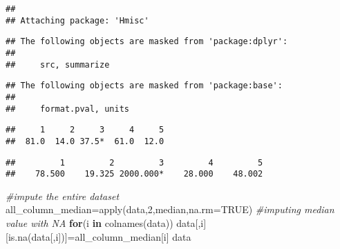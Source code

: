 \documentclass[
]{article}
\newenvironment{Shaded}{\begin{snugshade}}{\end{snugshade}}
\newcommand{\AttributeTok}[1]{\textcolor[rgb]{0.77,0.63,0.00}{#1}}
\newcommand{\CommentTok}[1]{\textcolor[rgb]{0.56,0.35,0.01}{\textit{#1}}}
\newcommand{\ConstantTok}[1]{\textcolor[rgb]{0.00,0.00,0.00}{#1}}
\newcommand{\ControlFlowTok}[1]{\textcolor[rgb]{0.13,0.29,0.53}{\textbf{#1}}}
\newcommand{\DecValTok}[1]{\textcolor[rgb]{0.00,0.00,0.81}{#1}}
\newcommand{\FunctionTok}[1]{\textcolor[rgb]{0.00,0.00,0.00}{#1}}
\newcommand{\NormalTok}[1]{#1}
\newcommand{\OtherTok}[1]{\textcolor[rgb]{0.56,0.35,0.01}{#1}}
\newcommand{\SpecialCharTok}[1]{\textcolor[rgb]{0.00,0.00,0.00}{#1}}
\begin{document}
\begin{verbatim}
## 
## Attaching package: 'Hmisc'
\end{verbatim}

\begin{verbatim}
## The following objects are masked from 'package:dplyr':
## 
##     src, summarize
\end{verbatim}

\begin{verbatim}
## The following objects are masked from 'package:base':
## 
##     format.pval, units
\end{verbatim}

\begin{Shaded}
\end{Shaded}

\begin{verbatim}
##     1     2     3     4     5 
##  81.0  14.0 37.5*  61.0  12.0
\end{verbatim}

\begin{Shaded}
\end{Shaded}

\begin{verbatim}
##         1         2         3         4         5 
##    78.500    19.325 2000.000*    28.000    48.002
\end{verbatim}

\begin{Shaded}
\begin{Highlighting}[]
\CommentTok{\#impute the entire dataset}
\NormalTok{all\_column\_median}\OtherTok{=}\FunctionTok{apply}\NormalTok{(data,}\DecValTok{2}\NormalTok{,median,}\AttributeTok{na.rm=}\ConstantTok{TRUE}\NormalTok{)}
\CommentTok{\#imputing median value with NA}
\ControlFlowTok{for}\NormalTok{(i }\ControlFlowTok{in} \FunctionTok{colnames}\NormalTok{(data))}
\NormalTok{  data[,i][}\FunctionTok{is.na}\NormalTok{(data[,i])]}\OtherTok{=}\NormalTok{all\_column\_median[i]}
\NormalTok{data}
\end{Highlighting}
\end{Shaded}
\end{document}
